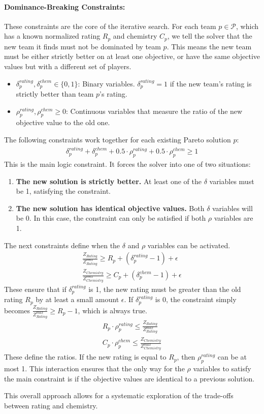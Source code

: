 \documentclass{article}
\begin{document}
\paragraph{Dominance-Breaking Constraints:} These constraints are the core of the iterative search. For each team $p \in \mathcal{P}$, which has a known normalized rating $R_p$ and chemistry $C_p$, we tell the solver that the new team it finds must not be dominated by team $p$. This means the new team must be either strictly better on at least one objective, or have the same objective values but with a different set of players.
\begin{itemize}
    \item $\delta^{rating}_p, \delta^{chem}_p \in \{0, 1\}$: Binary variables. $\delta^{rating}_p=1$ if the new team's rating is strictly better than team $p$'s rating.
    \item $\rho^{rating}_p, \rho^{chem}_p \ge 0$: Continuous variables that measure the ratio of the new objective value to the old one.
\end{itemize}
The following constraints work together for each existing Pareto solution $p$:
\begin{gather}
    \delta^{rating}_p + \delta^{chem}_p + 0.5 \cdot \rho^{rating}_p + 0.5 \cdot \rho^{chem}_p \ge 1
\end{gather}
This is the main logic constraint. It forces the solver into one of two situations:
\begin{enumerate}
    \item \textbf{The new solution is strictly better.} At least one of the $\delta$ variables must be 1, satisfying the constraint.
    \item \textbf{The new solution has identical objective values.} Both $\delta$ variables will be 0. In this case, the constraint can only be satisfied if both $\rho$ variables are 1.
\end{enumerate}
The next constraints define when the $\delta$ and $\rho$ variables can be activated.
\begin{gather}
    \frac{Z_{Rating}}{Z_{Rating}^{max}} \ge R_p + (\delta^{rating}_p - 1) + \epsilon \\
    \frac{Z_{Chemistry}}{Z_{Chemistry}^{max}} \ge C_p + (\delta^{chem}_p - 1) + \epsilon
\end{gather}
These ensure that if $\delta^{rating}_p$ is 1, the new rating must be greater than the old rating $R_p$ by at least a small amount $\epsilon$. If $\delta^{rating}_p$ is 0, the constraint simply becomes $\frac{Z_{Rating}}{Z_{Rating}^{max}} \ge R_p - 1$, which is always true.
\begin{gather}
    R_p \cdot \rho^{rating}_p \le \frac{Z_{Rating}}{Z_{Rating}^{max}} \\
    C_p \cdot \rho^{chem}_p \le \frac{Z_{Chemistry}}{Z_{Chemistry}^{max}}
\end{gather}
These define the ratios. If the new rating is equal to $R_p$, then $\rho^{rating}_p$ can be at most 1. This interaction ensures that the only way for the $\rho$ variables to satisfy the main constraint is if the objective values are identical to a previous solution.

This overall approach allows for a systematic exploration of the trade-offs between rating and chemistry.
\end{document}
